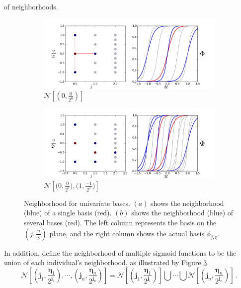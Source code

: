 of neighborhoods.
\begin{figure}[Htbp]\begin{center}
    \begin{subfigure}[p]{1.\textwidth}
        \centering
        \includegraphics[width=10cm]{../basis_neighbor.png}
        \caption{$\mathcal{N}\left[\left(0,\frac{0}{2^0}\right)\right]$}
        \label{fig: basis neighbor}
    \end{subfigure}
    \begin{subfigure}[p]{1.\textwidth}
        \centering
        \includegraphics[width=10cm]{../basis_neighbor_2.png}
        \caption{$\mathcal{N}\left[ \big(0, \frac{0}{2^0}\big), \big(1, \frac{-1}{2^1}\big)
                 \right]$}
        \label{fig: union neighbor}
    \end{subfigure}
    \caption{Neighborhood for univariate bases. 
             $(a)$ shows the neighborhood (blue)
             of a single basis (red).  $(b)$ shows the neighborhood (blue) 
             of several bases (red). 
             The left column represents the basis on the $\left(j, \frac{\eta}{2^j}\right)$ plane,
             and the right column shows the actual basis $\phi_{j,\eta}$.}
\end{center}\end{figure}
In addition, define the neighborhood of multiple sigmoid functions to be the union
of each individual's neighborhood, as illustrated by Figure \ref{fig: union neighbor}.
\begin{equation}
    \mathcal{N}\left[(\boldsymbol{j}_1, \frac{\boldsymbol{\eta}_1}{2^{\boldsymbol{j}_1}} ), \cdots, 
    ( \boldsymbol{j}_n, \frac{\boldsymbol{\eta}_n}{2^{\boldsymbol{j}_n}}) \right]
    = \mathcal{N}\left[(\boldsymbol{j}_1, \frac{\boldsymbol{\eta}_1}{2^{\boldsymbol{j}_1}})\right]\bigcup \cdots 
      \bigcup \mathcal{N}\left[(\boldsymbol{j}_n, \frac{\boldsymbol{\eta}_n}{2^{\boldsymbol{j}_n}})\right]\,.
\end{equation}\\

